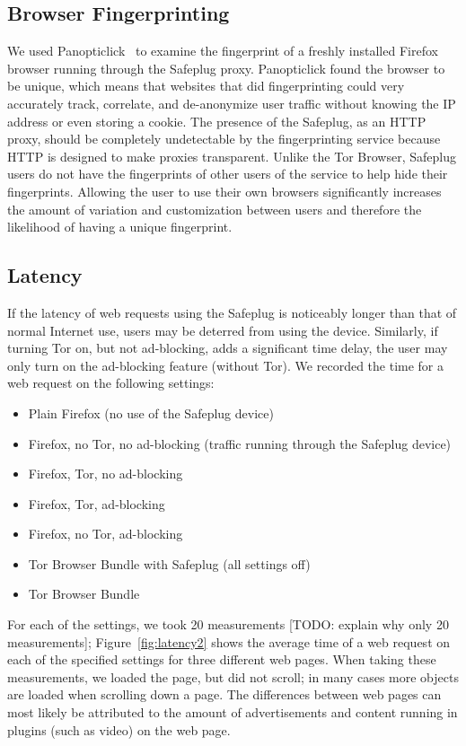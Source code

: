 \documentclass[letterpaper,twocolumn,10pt]{article}
\begin{document}
\subsection{Browser Fingerprinting}
We used Panopticlick~\cite{panopticlick} to examine the fingerprint of a freshly installed Firefox browser running through the Safeplug proxy.  Panopticlick found the browser to be unique, which means that websites that did fingerprinting could very accurately track, correlate, and de-anonymize user traffic without knowing the IP address or even storing a cookie.  The presence of the Safeplug, as an HTTP proxy, should be completely undetectable by the fingerprinting service because HTTP is designed to make proxies transparent.  Unlike the Tor Browser, Safeplug users do not have the fingerprints of other users of the service to help hide their fingerprints.  Allowing the user to use their own browsers significantly increases the amount of variation and customization between users and therefore the likelihood of having a unique fingerprint.

\subsection{Latency}
If the latency of web requests using the Safeplug is noticeably longer than that of normal Internet use, users may be deterred from using the device.  Similarly, if turning Tor on, but not ad-blocking, adds a significant time delay, the user may only turn on the ad-blocking feature (without Tor).  We recorded the time for a web request on the following settings:

\begin{itemize} %
\item Plain Firefox (no use of the Safeplug device)
\item Firefox, no Tor, no ad-blocking (traffic running through the Safeplug device)
\item Firefox, Tor, no ad-blocking
\item Firefox, Tor, ad-blocking
\item Firefox, no Tor, ad-blocking
\item Tor Browser Bundle with Safeplug (all settings off)
\item Tor Browser Bundle
\end{itemize}

For each of the settings, we took 20 measurements [TODO: explain why only 20 measurements]; Figure~\ref{fig:latency2} shows the average time of a web request on each of the specified settings for three different web pages.  When taking these measurements, we loaded the page, but did not scroll; in many cases more objects are loaded when scrolling down a page.  The differences between web pages can most likely be attributed to the amount of advertisements and content running in plugins (such as video) on the web page.  
\end{document}
